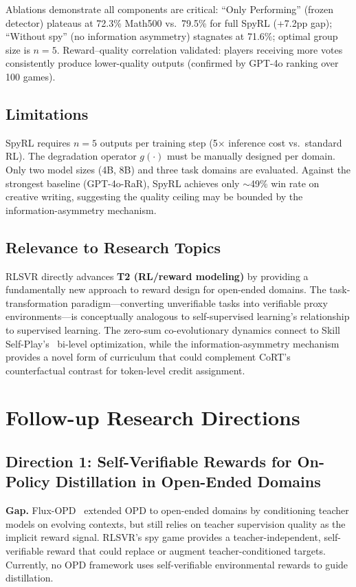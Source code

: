 \documentclass[11pt,a4paper]{article}
\begin{document}
Ablations demonstrate all components are critical: ``Only Performing'' (frozen detector) plateaus at 72.3\% Math500 vs.\ 79.5\% for full SpyRL (+7.2pp gap); ``Without spy'' (no information asymmetry) stagnates at 71.6\%; optimal group size is $n = 5$. Reward--quality correlation validated: players receiving more votes consistently produce lower-quality outputs (confirmed by GPT-4o ranking over 100 games).

\subsection{Limitations}
SpyRL requires $n = 5$ outputs per training step (5$\times$ inference cost vs.\ standard RL). The degradation operator $g(\cdot)$ must be manually designed per domain. Only two model sizes (4B, 8B) and three task domains are evaluated. Against the strongest baseline (GPT-4o-RaR), SpyRL achieves only $\sim$49\% win rate on creative writing, suggesting the quality ceiling may be bounded by the information-asymmetry mechanism.

\subsection{Relevance to Research Topics}
RLSVR directly advances \textbf{T2 (RL/reward modeling)} by providing a fundamentally new approach to reward design for open-ended domains. The task-transformation paradigm---converting unverifiable tasks into verifiable proxy environments---is conceptually analogous to self-supervised learning's relationship to supervised learning. The zero-sum co-evolutionary dynamics connect to Skill Self-Play's~\cite{skillselfplay2026} bi-level optimization, while the information-asymmetry mechanism provides a novel form of curriculum that could complement CoRT's~\cite{cort2026} counterfactual contrast for token-level credit assignment.

\section{Follow-up Research Directions}

\subsection{Direction 1: Self-Verifiable Rewards for On-Policy Distillation in Open-Ended Domains}

\textbf{Gap.} Flux-OPD~\cite{fluxopd2026} extended OPD to open-ended domains by conditioning teacher models on evolving contexts, but still relies on teacher supervision quality as the implicit reward signal. RLSVR's spy game provides a teacher-independent, self-verifiable reward that could replace or augment teacher-conditioned targets. Currently, no OPD framework uses self-verifiable environmental rewards to guide distillation.
\end{document}
